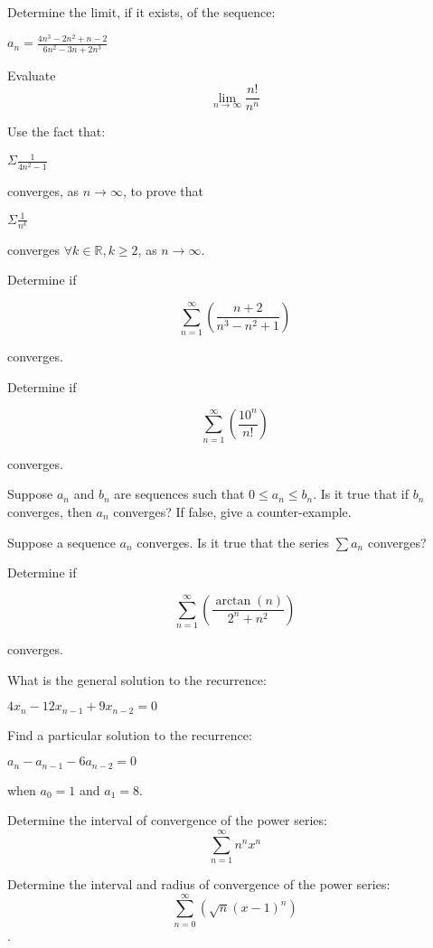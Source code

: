 \documentclass[12pt]{exam}
\begin{document}
\begin{questions}

\question Determine the limit, if it exists, of the sequence:

\begin{center}
    \Large $a_{n} = \frac{4n^{3}-2n^{2}+n-2}{6n^{2}-3n+2n^{3}}$
\end{center}

\question Evaluate $$\lim_{n \to \infty}\frac{n!}{n^n}$$

\question Use the fact that:

\begin{center}
    \Large $\Sigma \frac{1}{4n^{2}-1}$
\end{center}

converges, as $n \to \infty$, to prove that

\begin{center}
    \Large $\Sigma \frac{1}{n^{k}}$
\end{center}

converges $\forall k \in \mathbb{R}, k \geq 2$, as $n \to \infty$.

\question Determine if

    $$\sum_{n=1}^{\infty}(\frac{n+2}{n^3-n^2+1})$$

converges.

\question Determine if

    $$\sum_{n=1}^{\infty}(\frac{10^n}{n!})$$


converges.

\question Suppose $a_{n}$ and $b_{n}$ are sequences such that $0 \leq a_{n} \leq b_{n}$. Is it true that if $b_{n}$ converges, then $a_{n}$ converges? If false, give a counter-example.

\question Suppose a sequence $a_{n}$ converges. Is it true that the series $\sum a_{n}$ converges?

\question Determine if

    $$\sum_{n=1}^{\infty}(\frac{\arctan(n)}{2^{n}+n^{2}})$$


converges.

\question What is the general solution to the recurrence:

\begin{center}
    $4x_{n}-12x_{n-1}+9x_{n-2}=0$
\end{center}

\question Find a particular solution to the recurrence:
\begin{center}
    $a_{n} - a_{n-1} - 6a_{n-2} = 0$
\end{center}

when $a_{0} = 1$ and $a_{1} = 8$.

\question Determine the interval of convergence of the power series: $$\sum_{n=1}^{\infty}n^{n}x^{n}$$

\question Determine the interval and radius of convergence of the power series: $$\sum_{n=0}^{\infty}(\sqrt{n}(x-1)^{n})$$.

\end{questions}
\end{document}

